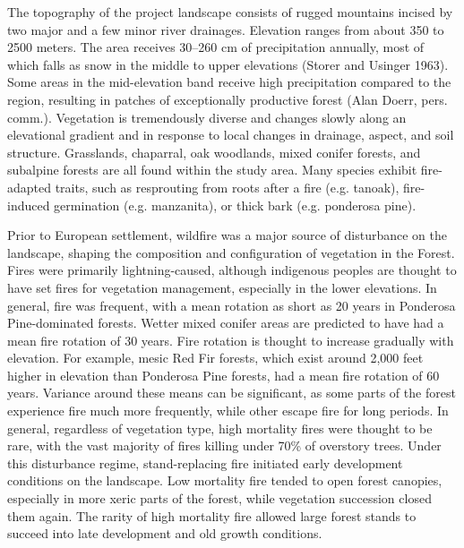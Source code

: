 The topography of the project landscape consists of rugged mountains incised by two major and a few minor river drainages. Elevation ranges from about 350 to 2500 meters. The area receives 30--260 cm of precipitation annually, most of which falls as snow in the middle to upper elevations (Storer and Usinger 1963). Some areas in the mid-elevation band receive high precipitation compared to the region, resulting in patches of exceptionally productive forest (Alan Doerr, pers. comm.). Vegetation is tremendously diverse and changes slowly along an elevational gradient and in response to local changes in drainage, aspect, and soil structure. Grasslands, chaparral, oak woodlands, mixed conifer forests, and subalpine forests are all found within the study area. Many species exhibit fire-adapted traits, such as resprouting from roots after a fire (e.g. tanoak), fire-induced germination (e.g. manzanita), or thick bark (e.g. ponderosa pine). 

Prior to European settlement, wildfire was a major source of disturbance on the landscape, shaping the composition and configuration of vegetation in the Forest. Fires were primarily lightning-caused, although indigenous peoples are thought to have set fires for vegetation management, especially in the lower elevations. In general, fire was frequent, with a mean rotation as short as 20 years in Ponderosa Pine-dominated forests. Wetter mixed conifer areas are predicted to have had a mean fire rotation of 30 years. Fire rotation is thought to increase gradually with elevation. For example, mesic Red Fir forests, which exist around 2,000 feet higher in elevation than Ponderosa Pine forests, had a mean fire rotation of 60 years. Variance around these means can be significant, as some parts of the forest experience fire much more frequently, while other escape fire for long periods. In general, regardless of vegetation type, high mortality fires were thought to be rare, with the vast majority of fires killing under 70\% of overstory trees. Under this disturbance regime, stand-replacing fire initiated early development conditions on the landscape. Low mortality fire tended to open forest canopies, especially in more xeric parts of the forest, while vegetation succession closed them again. The rarity of high mortality fire allowed large forest stands to succeed into late development and old growth conditions. 


